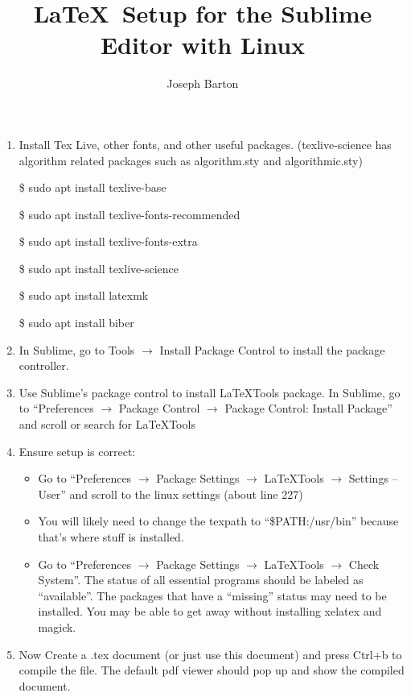 \documentclass{article}
\title{\LaTeX \ Setup for the Sublime Editor with Linux}
\author{Joseph Barton}
\date{}
\begin{document}
\maketitle

\begin{enumerate}
	\item Install Tex Live, other fonts, and other useful packages. (texlive-science has algorithm related packages such as algorithm.sty and algorithmic.sty)

	\$ sudo apt install texlive-base

	\$ sudo apt install texlive-fonts-recommended

	\$ sudo apt install texlive-fonts-extra

	\$ sudo apt install texlive-science

	\$ sudo apt install latexmk

	\$ sudo apt install biber

\item In Sublime, go to Tools $\rightarrow$ Install Package Control to install the package controller.

\item Use Sublime's package control to install LaTeXTools package. In Sublime, go to ``Preferences $\rightarrow$ Package Control $\rightarrow$ Package Control: Install Package'' and scroll or search for LaTeXTools

\item Ensure setup is correct:
	\begin{itemize}
	\item Go to ``Preferences $\rightarrow$ Package Settings $\rightarrow$ LaTeXTools $\rightarrow$ Settings -- User'' and scroll to the linux settings (about line 227)
	\item You will likely need to change the texpath to ``\$PATH:/usr/bin'' because that's where stuff is installed.
	\item Go to ``Preferences $\rightarrow$ Package Settings $\rightarrow$ LaTeXTools $\rightarrow$ Check System''. The status of all essential programs should be labeled as ``available''. The packages that have a ``missing'' status may need to be installed.  You may be able to get away without installing xelatex and magick.
	\end{itemize}

\item Now Create a .tex document (or just use this document) and press Ctrl+b to compile the file. The default pdf viewer should pop up and show the compiled document.


\end{enumerate}
\end{document}
